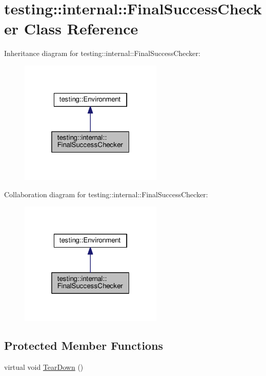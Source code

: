 \hypertarget{classtesting_1_1internal_1_1FinalSuccessChecker}{}\section{testing\+:\+:internal\+:\+:Final\+Success\+Checker Class Reference}
\label{classtesting_1_1internal_1_1FinalSuccessChecker}


Inheritance diagram for testing\+:\+:internal\+:\+:Final\+Success\+Checker\+:\nopagebreak
\begin{figure}[H]
\begin{center}
\leavevmode
\includegraphics[width=193pt]{classtesting_1_1internal_1_1FinalSuccessChecker__inherit__graph}
\end{center}
\end{figure}


Collaboration diagram for testing\+:\+:internal\+:\+:Final\+Success\+Checker\+:\nopagebreak
\begin{figure}[H]
\begin{center}
\leavevmode
\includegraphics[width=193pt]{classtesting_1_1internal_1_1FinalSuccessChecker__coll__graph}
\end{center}
\end{figure}
\subsection*{Protected Member Functions}
\begin{DoxyCompactItemize}
\item 
virtual void \hyperlink{classtesting_1_1internal_1_1FinalSuccessChecker_a8f39d12a1f2bfe8c6c04b5c6749382c9}{Tear\+Down} ()
\end{DoxyCompactItemize}
